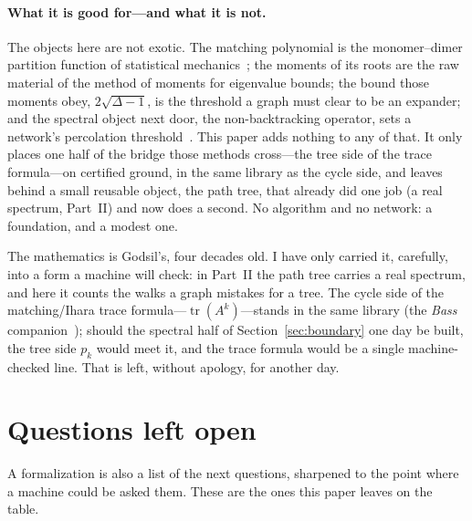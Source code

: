 \documentclass[11pt]{article}
\DeclareMathOperator{\tr}{tr}
\begin{document}
\paragraph{What it is good for---and what it is not.} The objects here are not exotic. The matching
polynomial is the monomer--dimer partition function of statistical mechanics~\cite{HeilmannLieb}; the
moments of its roots are the raw material of the method of moments for eigenvalue bounds; the bound
those moments obey, $2\sqrt{\Delta-1}$, is the threshold a graph must clear to be an expander; and the
spectral object next door, the non-backtracking operator, sets a network's percolation
threshold~\cite{Hashimoto,Bass}. This paper adds nothing to any of that. It only places one half of
the bridge those methods cross---the tree side of the trace formula---on certified ground, in the same
library as the cycle side, and leaves behind a small reusable object, the path tree, that already did
one job (a real spectrum, Part~II) and now does a second. No algorithm and no network: a foundation,
and a modest one.

The mathematics is Godsil's, four decades old. I have only carried it, carefully, into a form a
machine will check: in Part~II the path tree carries a real spectrum, and here it counts the walks a
graph mistakes for a tree. The cycle side of the matching/Ihara trace formula---$\tr(A^k)$---stands in
the same library (the \emph{Bass} companion~\cite{Bass}); should the spectral half of
Section~\ref{sec:boundary} one day be built, the tree side $p_k$ would meet it, and the trace formula
would be a single machine-checked line. That is left, without apology, for another day.

\section{Questions left open}
\label{sec:questions}

A formalization is also a list of the next questions, sharpened to the point where a machine could be
asked them. These are the ones this paper leaves on the table.
\end{document}
